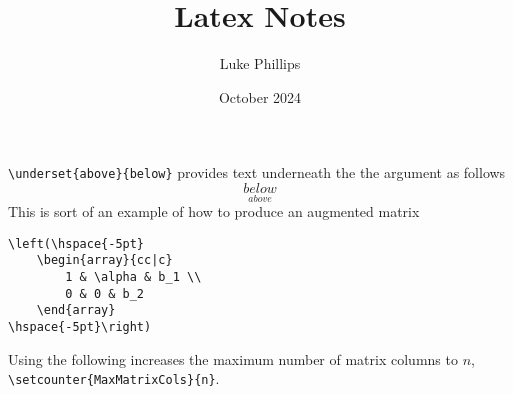 \documentclass[10pt, a4paper]{article}
\title{Latex Notes}
\author{Luke Phillips}
\date{October 2024}
\begin{document}
\maketitle

\newpage

\verb|\underset{above}{below}| provides text underneath the the argument as follows
\[
\underset{above}{below}
\]
This is sort of an example of how to produce an augmented matrix
\begin{verbatim}
\left(\hspace{-5pt}
    \begin{array}{cc|c}
        1 & \alpha & b_1 \\
        0 & 0 & b_2
    \end{array}
\hspace{-5pt}\right)
\end{verbatim}

Using the following increases the maximum number of matrix columns to $n$,
\verb|\setcounter{MaxMatrixCols}{n}|.
\end{document}
